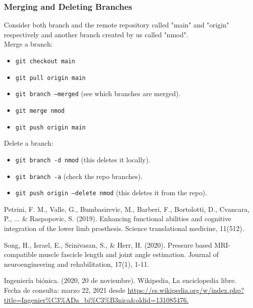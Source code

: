 \documentclass{article}
\begin{document}
    \subsubsection{Merging and Deleting Branches}
    
    Consider both branch and the remote repository called "main" and "origin" respectively and another branch created by us called "nmod".\vspace{0.5cm}\\
    
    Merge a branch:
    \begin{itemize}
    	\item {\tt git checkout main}
    	\item {\tt git pull origin main}
    	\item {\tt git branch --merged} (see which branches are merged).
    	\item {\tt git merge nmod}
    	\item {\tt git push origin main}
    \end{itemize}

    Delete a branch:
    \begin{itemize}
	    \item {\tt git branch -d nmod} (this deletes it locally).
	    \item {\tt git branch -a} (check the repo branches).
	    \item {\tt git push origin --delete nmod} (this deletes it from the repo).
    \end{itemize}
    
	\pagebreak
	
	\begin{thebibliography}{9}
		Petrini, F. M., Valle, G., Bumbasirevic, M., Barberi, F., Bortolotti, D., Cvancara, P., ... \& Raspopovic, S. (2019). Enhancing functional abilities and cognitive integration of the lower limb prosthesis. Science translational medicine, 11(512).
		
		Song, H., Israel, E., Srinivasan, S., \& Herr, H. (2020). Pressure based MRI-compatible muscle fascicle length and joint angle estimation. Journal of neuroengineering and rehabilitation, 17(1), 1-11.
		
		Ingeniería biónica. (2020, 20 de noviembre). Wikipedia, La enciclopedia libre. Fecha de consulta: marzo 22, 2021 desde
		\url{https://es.wikipedia.org/w/index.php?title=Ingenier%C3%ADa_bi%C3%B3nica&oldid=131085476.}
		\end{thebibliography}
		
	
\end{document}
